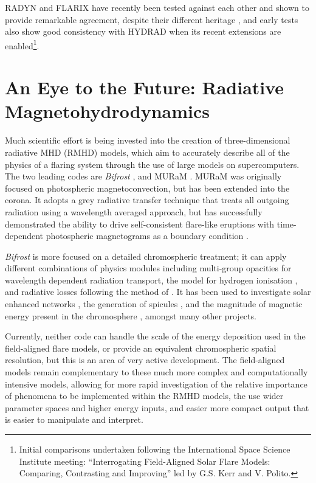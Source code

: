 RADYN and FLARIX have recently been tested against each other and shown to provide remarkable agreement, despite their different heritage \citep{Kasparova2019}, and early tests also show good consistency with HYDRAD when its recent extensions are enabled\footnote{Initial comparisons undertaken following the International Space Science Institute meeting: ``Interrogating Field-Aligned Solar Flare Models: Comparing, Contrasting and Improving'' led by G.S. Kerr and V. Polito.}.

\section{An Eye to the Future: Radiative Magnetohydrodynamics}

Much scientific effort is being invested into the creation of three-dimensional radiative MHD (RMHD) models, which aim to accurately describe all of the physics of a flaring system through the use of large models on supercomputers. The two leading codes are \textit{Bifrost} \citep{Gudiksen2011}, and MURaM \citep{Rempel2009,Rempel2016}. MURaM was originally focused on photospheric magnetoconvection, but has been extended into the corona. It adopts a grey radiative transfer technique that treats all outgoing radiation using a wavelength averaged approach, but has successfully demonstrated the ability to drive self-consistent flare-like eruptions with time-dependent photospheric magnetograms as a boundary condition \citep{Cheung2019}.

\textit{Bifrost} is more focused on a detailed chromospheric treatment; it can apply different combinations of physics modules including multi-group opacities for wavelength dependent radiation transport, the \citet{Sollum1999} model for hydrogen ionisation \citep[following the treatment of][]{Leenaarts2007}, and radiative losses following the method of \citet{Carlsson2012}.
It has been used to investigate solar enhanced networks \citep{Carlsson2016}, the generation of spicules \citep{Martinez-Sykora2017}, and the magnitude of magnetic energy present in the chromosphere \citep{Martinez-Sykora2019}, amongst many other projects.

Currently, neither code can handle the scale of the energy deposition used in the field-aligned flare models, or provide an equivalent chromospheric spatial resolution, but this is an area of very active development.
The field-aligned models remain complementary to these much more complex and computationally intensive models, allowing for more rapid investigation of the relative importance of phenomena to be implemented within the RMHD models, the use wider parameter spaces and higher energy inputs, and easier more compact output that is easier to manipulate and interpret.


